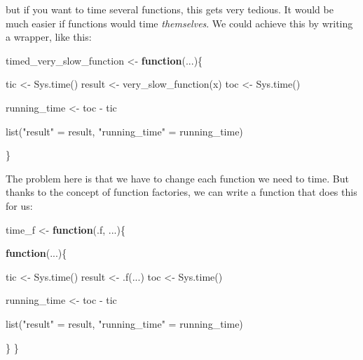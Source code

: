 \documentclass[
]{article}
\newenvironment{Shaded}{\begin{snugshade}}{\end{snugshade}}
\newcommand{\ControlFlowTok}[1]{\textcolor[rgb]{0.13,0.29,0.53}{\textbf{#1}}}
\newcommand{\FunctionTok}[1]{\textcolor[rgb]{0.00,0.00,0.00}{#1}}
\newcommand{\NormalTok}[1]{#1}
\newcommand{\OtherTok}[1]{\textcolor[rgb]{0.56,0.35,0.01}{#1}}
\newcommand{\SpecialCharTok}[1]{\textcolor[rgb]{0.00,0.00,0.00}{#1}}
\newcommand{\StringTok}[1]{\textcolor[rgb]{0.31,0.60,0.02}{#1}}
\begin{document}
but if you want to time several functions, this gets very tedious. It would be much easier if functions would
time \emph{themselves}. We could achieve this by writing a wrapper, like this:

\begin{Shaded}
\begin{Highlighting}[]
\NormalTok{timed\_very\_slow\_function }\OtherTok{\textless{}{-}} \ControlFlowTok{function}\NormalTok{(...)\{}

\NormalTok{  tic }\OtherTok{\textless{}{-}} \FunctionTok{Sys.time}\NormalTok{()}
\NormalTok{  result }\OtherTok{\textless{}{-}} \FunctionTok{very\_slow\_function}\NormalTok{(x)}
\NormalTok{  toc }\OtherTok{\textless{}{-}} \FunctionTok{Sys.time}\NormalTok{()}

\NormalTok{  running\_time }\OtherTok{\textless{}{-}}\NormalTok{ toc }\SpecialCharTok{{-}}\NormalTok{ tic}

  \FunctionTok{list}\NormalTok{(}\StringTok{"result"} \OtherTok{=}\NormalTok{ result,}
       \StringTok{"running\_time"} \OtherTok{=}\NormalTok{ running\_time)}

\NormalTok{\}}
\end{Highlighting}
\end{Shaded}

The problem here is that we have to change each function we need to time. But thanks to the concept of function
factories, we can write a function that does this for us:

\begin{Shaded}
\begin{Highlighting}[]
\NormalTok{time\_f }\OtherTok{\textless{}{-}} \ControlFlowTok{function}\NormalTok{(.f, ...)\{}

  \ControlFlowTok{function}\NormalTok{(...)\{}

\NormalTok{    tic }\OtherTok{\textless{}{-}} \FunctionTok{Sys.time}\NormalTok{()}
\NormalTok{    result }\OtherTok{\textless{}{-}} \FunctionTok{.f}\NormalTok{(...)}
\NormalTok{    toc }\OtherTok{\textless{}{-}} \FunctionTok{Sys.time}\NormalTok{()}

\NormalTok{    running\_time }\OtherTok{\textless{}{-}}\NormalTok{ toc }\SpecialCharTok{{-}}\NormalTok{ tic}

    \FunctionTok{list}\NormalTok{(}\StringTok{"result"} \OtherTok{=}\NormalTok{ result,}
         \StringTok{"running\_time"} \OtherTok{=}\NormalTok{ running\_time)}

\NormalTok{  \}}
\NormalTok{\}}
\end{Highlighting}
\end{Shaded}
\end{document}
